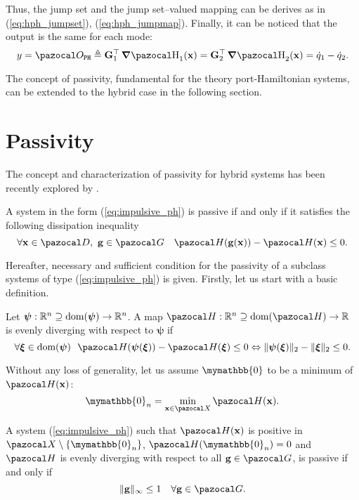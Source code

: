 \begin{exmp}
    Thus, the jump set and the jump set--valued mapping can be derives as in (\ref{eq:hph_jumpset}), (\ref{eq:hph_jumpmap}).
    Finally, it can be noticed that the output is the same for each mode:
    \begin{equation}
        y = \Oo_{\tt PH}\triangleq\Gb_1^\top\dH_1(\xb) = \Gb_2^\top\dH_2(\xb) = \dot{q}_1 - \dot{q}_2. 
    \end{equation}
\end{exmp}
%
%
The concept of passivity, fundamental for the
theory port-Hamiltonian systems, can be extended to
the hybrid case in the following section.
%
\clearpage
%
\section{Passivity}
%
The concept and characterization of passivity for hybrid systems has been recently explored by \cite{naldi2013passivity}.
%
\begin{defn}\label{def:impulsive_passivity}
    A system in the form (\ref{eq:impulsive_ph}) is passive if and only if it satisfies the following dissipation inequality
    \begin{equation}
        \forall\xb\in\D,~\mathbf{g}\in\G \quad \Ha(\mathbf{g}(\xb))-\Ha(\xb)\leq 0.
    \end{equation}
\end{defn}
%
Hereafter, necessary and sufficient condition for the passivity of a subclass systems of type (\ref{eq:impulsive_ph}) is given. Firstly, let us start with a basic definition.
%
\begin{defn}
	Let $\bm\psi:\mathbb{R}^n\supseteq\text{dom}(\bm\psi)\rightarrow\mathbb{R}^n$. A map $\Ha:\R^n\supseteq\dom(\Ha)\rightarrow\R$ is evenly diverging with respect to $\bm\psi$ if
	\begin{equation}
	    \forall\bm\xi\in\dom(\bm\psi)~~\Ha(\bm\psi(\bm\xi))-\Ha(\bm\xi)\leq 0 \Leftrightarrow \|\bm\psi(\bm\xi)\|_2-\|\bm\xi\|_2\leq {0}.
	\end{equation}
\end{defn}
%
\begin{prop}\label{prop:pass_impulsive}
	Without any loss of generality, let us assume $\mymathbb{0}$ to be a minimum of $\Ha(\xb)$:
	\begin{equation}
	    \mymathbb{0}_n = \min_{\x\in\X}\Ha(\xb).
	\end{equation}
	
	A system (\ref{eq:impulsive_ph}) such that $\Ha(\xb)$ is positive in $\X\setminus\{\mymathbb{0}_n\}$, $\Ha(\mymathbb{0}_n)=0$ and $\Ha$ is evenly diverging with respect to all $\mathbf{g}\in\G$, is passive if and only if 
	\begin{equation}\label{eq:nl_pass}
		\|\mathbf{g}\|_\infty\leq 1\quad\forall \mathbf{g}\in\G.
	\end{equation}
\end{prop}
